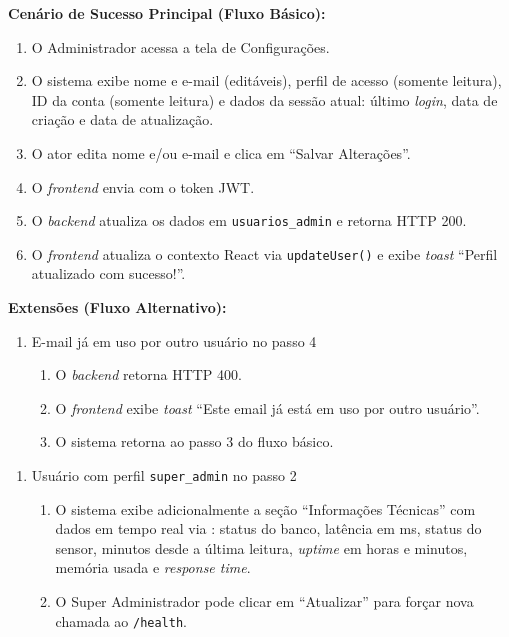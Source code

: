 \textbf{Cenário de Sucesso Principal (Fluxo Básico):}
\begin{enumerate}
  \item O Administrador acessa a tela de Configurações.
  \item O sistema exibe nome e e-mail (editáveis), perfil
        de acesso (somente leitura), ID da conta (somente leitura) e dados
        da sessão atual: último \textit{login}, data de
        criação e data de atualização.
  \item O ator edita nome e/ou e-mail e clica em
        ``Salvar Alterações''.
  \item O \textit{frontend} envia
         com o token JWT.
  \item O \textit{backend} atualiza os dados em
        \texttt{usuarios\_admin} e retorna HTTP 200.
  \item O \textit{frontend} atualiza o contexto React via
        \texttt{updateUser()} e exibe \textit{toast}
        ``Perfil atualizado com sucesso!''.
\end{enumerate}

\textbf{Extensões (Fluxo Alternativo):}

\begin{enumerate}
  \renewcommand{\theenumi}{4a}
  \renewcommand{\labelenumi}{\theenumi.}
  \item E-mail já em uso por outro usuário no passo 4
  \begin{enumerate}
  \item O \textit{backend} retorna HTTP 400.
  \item O \textit{frontend} exibe \textit{toast}
        ``Este email já está em uso por outro usuário''.
  \item O sistema retorna ao passo 3 do fluxo básico.
  \end{enumerate}
\end{enumerate}

\begin{enumerate}
  \renewcommand{\theenumi}{2a}
  \renewcommand{\labelenumi}{\theenumi.}
  \item Usuário com perfil \texttt{super\_admin} no passo 2
  \begin{enumerate}
  \item O sistema exibe adicionalmente a seção
        ``Informações Técnicas'' com dados em tempo real
        via : status do banco,
        latência em ms, status do sensor, minutos desde
        a última leitura, \textit{uptime} em horas e
        minutos, memória usada e \textit{response time}.
  \item O Super Administrador pode clicar em ``Atualizar''
        para forçar nova chamada ao \texttt{/health}.
  \end{enumerate}
\end{enumerate}

